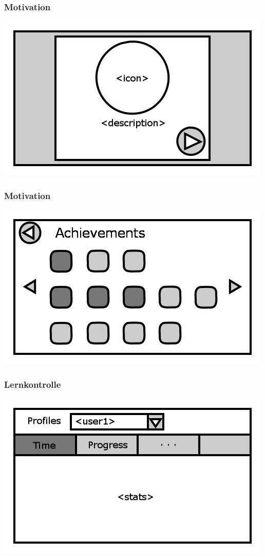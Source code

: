 \documentclass[t]{beamer}
\begin{document}
\begin{frame}
	\frametitle{Motivation}
	\includegraphics[height=\textheight]{achievement_notification.png}
\end{frame}
\begin{frame}
	\frametitle{Motivation}
	\includegraphics[height=\textheight]{achievements.png}
\end{frame}
\begin{frame}
	\frametitle{Lernkontrolle}
	\includegraphics[height=\textheight]{stats.png}
\end{frame}
\end{document}
